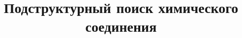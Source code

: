 \documentclass[11pt]{article}
\title{Подструктурный поиск химического соединения}
\begin{document}
\maketitle

\begin{figure}[!ht]
 \centering
 
\end{figure}
\end{document}
